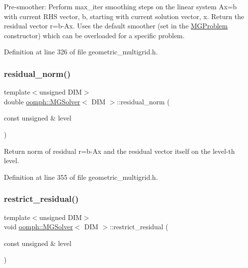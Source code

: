Pre-\/smoother\+: Perform \textquotesingle{}max\+\_\+iter\textquotesingle{} smoothing steps on the linear system Ax=b with current R\+HS vector, b, starting with current solution vector, x. Return the residual vector r=b-\/\+Ax. Uses the default smoother (set in the \hyperlink{classoomph_1_1MGProblem}{M\+G\+Problem} constructor) which can be overloaded for a specific problem. 



Definition at line 326 of file geometric\+\_\+multigrid.\+h.

\mbox{\label{classoomph_1_1MGSolver_ae1780530c59f06913884eec764a4b6cc}} 
\subsubsection{\texorpdfstring{residual\+\_\+norm()}{residual\_norm()}}
{\footnotesize\ttfamily template$<$unsigned D\+IM$>$ \\
double \hyperlink{classoomph_1_1MGSolver}{oomph\+::\+M\+G\+Solver}$<$ D\+IM $>$\+::residual\+\_\+norm (\begin{DoxyParamCaption}\item[{const unsigned \&}]{level }\end{DoxyParamCaption})\hspace{0.3cm}{\ttfamily [inline]}}



Return norm of residual r=b-\/\+Ax and the residual vector itself on the level-\/th level. 



Definition at line 355 of file geometric\+\_\+multigrid.\+h.

\mbox{\label{classoomph_1_1MGSolver_a755ee1fd473faa22f342829dadbe4e51}} 
\subsubsection{\texorpdfstring{restrict\+\_\+residual()}{restrict\_residual()}}
{\footnotesize\ttfamily template$<$unsigned D\+IM$>$ \\
void \hyperlink{classoomph_1_1MGSolver}{oomph\+::\+M\+G\+Solver}$<$ D\+IM $>$\+::restrict\+\_\+residual (\begin{DoxyParamCaption}\item[{const unsigned \&}]{level }\end{DoxyParamCaption})}



